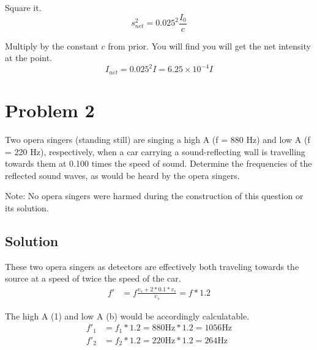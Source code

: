 \documentclass[12pt]{article}
\newcommand{\E}[1]{\times 10^{#1}}
\begin{document}
                Square it.
                \begin{equation}
                    s_{net}^2 = 0.025^2 \frac{I_0}{c}
                \end{equation}

                Multiply by the constant $c$ from prior.
                You will find you will get the net intensity at the point.
                \begin{equation}
                    I_{net} =   0.025^2 I
                        =   \boxed{6.25\E{-4} I}
                \end{equation}

    \pagebreak
    \section{Problem 2}
        Two opera singers (standing still) are singing a high A (f = 880 Hz) and low A (f = 220 Hz), respectively, when a car carrying a sound-reﬂecting wall is travelling towards them at 0.100 times the speed of sound. 
        Determine the frequencies of the reﬂected sound waves, as would be heard by the opera singers.
        
        Note: No opera singers were harmed during the construction of this question or its solution.

        \subsection{Solution}
            These two opera singers as detectors are effectively both traveling towards the source at a speed of twice the speed of the car.
            \begin{align}
                f'  &=  f\frac{v_s + 2 * 0.1 * v_s}{v_s}
                    =   f * 1.2
            \end{align}

            The high A (1) and low A (b) would be accordingly calculatable.
            \begin{align}
                f'_1 &= f_1 * 1.2 = 880\unit{\hertz} * 1.2 = \boxed{1056\unit{\hertz}}\\
                f'_2 &= f_2 * 1.2 = 220\unit{\hertz} * 1.2 = \boxed{264\unit{\hertz}}
            \end{align}
\end{document}

